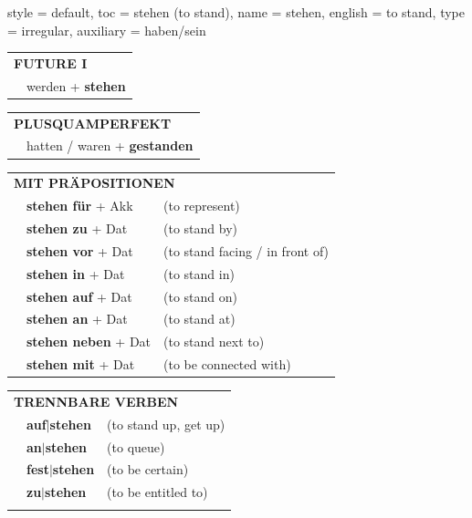 \begin{verbentry}{
  style = {default},
  toc = {stehen (to stand)},
  name = {stehen},
  english = {to stand},
  type = {irregular},
  auxiliary = {haben/sein}
}
\begin{tabular}{rl}
    \multicolumn{2}{l}{\textbf{FUTURE I} }\\
  &  werden + \textbf{stehen}\\
 
  \end{tabular}
\hfill
   \begin{tabular}{rl}
      \multicolumn{2}{l}{\textbf{PLUSQUAMPERFEKT}}\\
  &  hatten / waren + \textbf{gestanden}\\
  \end{tabular}

   \vspace{10pt}

   \begin{tabular}{lll}
      \multicolumn{3}{l}{\textbf{MIT PRÄPOSITIONEN}}\\
& \textbf{stehen für} + Akk & (to represent)\\
& \textbf{stehen zu} + Dat & (to stand by)\\
&\textbf{stehen vor} + Dat & (to stand facing / in front of)\\
&\textbf{stehen in} + Dat & (to stand in)\\
&\textbf{stehen auf} + Dat & (to stand on)\\
&\textbf{stehen an} + Dat & (to stand at)\\
&\textbf{stehen neben} + Dat & (to stand next to)\\
&\textbf{stehen mit} + Dat & (to be connected with)\\
  \end{tabular}
  \hfill
   \begin{tabular}{lll}
      \multicolumn{3}{l}{\textbf{TRENNBARE VERBEN}}\\
 & \textbf{auf$|$stehen} & (to stand up, get up)\\
 & \textbf{an$|$stehen} & (to queue)\\
     & \textbf{fest$|$stehen} & (to be certain)\\
     & \textbf{zu$|$stehen} & (to be entitled to)\\
\vspace{40pt}
  \end{tabular}


  \vspace{-5pt}
\end{verbentry}

